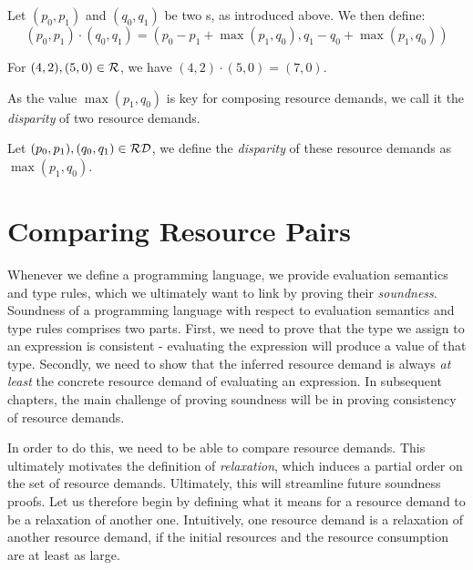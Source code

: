 \begin{definition}
   \label{def:multiplying-pairs}
   Let \((p_0, p_1)\) and \((q_0, q_1)\) be two s, as introduced above. We then define:
   \[(p_0, p_1) \cdot (q_0, q_1) = (p_0 - p_1 + \max(p_1, q_0), q_1 - q_0 + \max(p_1, q_0))\]
\end{definition}

\begin{example}
   For \((4, 2), (5,0) \in \mathcal{R}\), we have \((4, 2) \cdot (5, 0) = (7,0)\).
\end{example}
 
As the value \(\max(p_1, q_0)\) is key for composing resource demands, we call it the \emph{disparity} of two resource demands.

\begin{definition}
   \label{def:resource-disparity}
   Let \((p_0, p_1), (q_0, q_1) \in \mathcal{RD}\), we define the \emph{disparity} of these resource demands as \(\max(p_1, q_0)\).
\end{definition}



\section{Comparing Resource Pairs}

Whenever we define a programming language, we provide evaluation semantics and type rules, which we ultimately want to link by proving their \emph{soundness}. Soundness of a programming language with respect to evaluation semantics and type rules comprises two parts. First, we need to prove that the type we assign to an expression is consistent - evaluating the expression will produce a value of that type. Secondly, we need to show that the inferred resource demand is always \emph{at least} the concrete resource demand of evaluating an expression. In subsequent chapters, the main challenge of proving soundness will be in proving consistency of resource demands. 

In order to do this, we need to be able to compare resource demands. This ultimately motivates the definition of \emph{relaxation}, which induces a partial order on the set of resource demands. Ultimately, this will streamline future soundness proofs. Let us therefore begin by defining what it means for a resource demand to be a relaxation of another one. Intuitively, one resource demand is a relaxation of another resource demand, if the initial resources and the resource consumption are at least as large.

